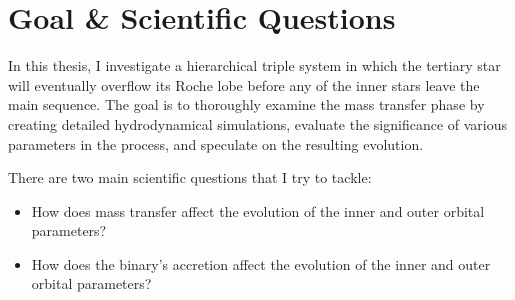 \section{Goal \& Scientific Questions}

In this thesis, I investigate a hierarchical triple system in which the tertiary star will eventually overflow its Roche lobe before any of the inner stars leave the main sequence. The goal is to thoroughly examine the mass transfer phase by creating detailed hydrodynamical simulations, evaluate the significance of various parameters in the process, and speculate on the resulting evolution.

There are two main scientific questions that I try to tackle:

\begin{itemize}
    \item How does mass transfer affect the evolution of the inner and outer orbital parameters?
    \item How does the binary's accretion affect the evolution of the inner and outer orbital parameters?
\end{itemize}


